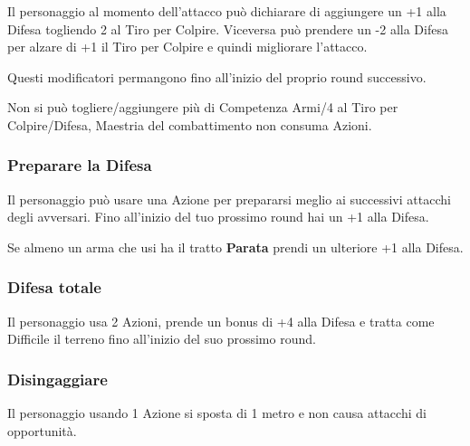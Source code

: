 \begin{multicols}{2}
Il personaggio al momento dell'attacco può dichiarare di aggiungere un +1 alla Difesa togliendo 2 al Tiro per Colpire. Viceversa può prendere un -2 alla Difesa per alzare di +1 il Tiro per Colpire e quindi migliorare l'attacco.

Questi modificatori permangono fino all'inizio del proprio round successivo.

Non si può togliere/aggiungere più di Competenza Armi/4 al Tiro per Colpire/Difesa, Maestria del combattimento non consuma Azioni.

\subsubsection{Preparare la Difesa}\label{preparareladifesa}\hypertarget{preparareladifesa}{}

Il personaggio può usare una Azione per prepararsi meglio ai successivi attacchi degli avversari. Fino all'inizio del tuo prossimo round hai un +1 alla Difesa.

Se almeno un arma che usi ha il tratto \textbf{Parata} prendi un ulteriore +1 alla Difesa.

\subsubsection{Difesa totale} \label{difesatotale}\hypertarget{difesatotale}{}

Il personaggio usa 2 Azioni, prende un bonus di +4 alla Difesa e tratta come Difficile il terreno fino all'inizio del suo prossimo round.

\subsubsection{Disingaggiare} \label{disingaggiare}\hypertarget{disingaggiare}{}

Il personaggio usando 1 Azione si sposta di 1 metro e non causa attacchi di opportunità.




\end{multicols}
